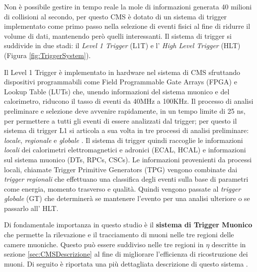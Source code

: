 Non è possibile gestire in tempo reale la mole di informazioni generata 40 milioni di collisioni al secondo, per questo CMS è dotato di un sistema di trigger implementato come primo passo nella selezione di eventi fisici al fine di ridurre il volume di dati, mantenendo però quelli interessanti. Il sistema di trigger si suddivide in due stadi: il \textit{Level 1 Trigger} (L1T) e l' \textit{High Level Trigger} (HLT) (Figura \ref{fig:TriggerSystem}). 

Il Level 1 Trigger è implementato in hardware nel sistema di CMS sfruttando dispositivi programmabili come Field Programmable Gate Arrays (FPGA) e Lookup Table (LUTs) che, unendo informazioni del sistema muonico e del calorimetro, riducono il tasso di eventi da 40MHz a 100KHz. Il processo di analisi preliminare e selezione deve avvenire rapidamente, in un tempo limite di 25 ns, per permettere a tutti gli eventi di essere analizzati dal trigger; per questo il sistema di trigger L1 si articola a sua volta in tre processi di analisi preliminare: \textit{locale}, \textit{regionale} e \textit{globale} \cite{MasterThesisNicLai}.
Il sistema di trigger quindi raccoglie le informazioni \textit{locali} dei calorimetri elettromagnetici e adronici (ECAL, HCAL) e informazioni sul sistema muonico (DTs, RPCs, CSCs). Le informazioni provenienti da processi locali, chiamate Trigger Primitive Generators (TPG) vengono combinate dai \textit{trigger regionali} che effettuano una classifica degli eventi sulla base di parametri come energia, momento trasverso e qualità. Quindi vengono passate al \textit{trigger globale} (GT) che determinerà se mantenere l'evento per una analisi ulteriore o se passarlo all' HLT.


Di fondamentale importanza in questo studio è il \textbf{sistema di Trigger Muonico} che permette la rilevazione e il tracciamento di muoni nelle tre regioni delle camere muoniche. Questo può essere suddiviso nelle tre regioni in $\eta$ descritte in sezione \ref{sec:CMSDescrizione} al fine di migliorare l'efficienza di ricostruzione dei muoni. Di seguito è riportata una più dettagliata descrizione di questo sistema \cite{sirunyan2020performance}.

